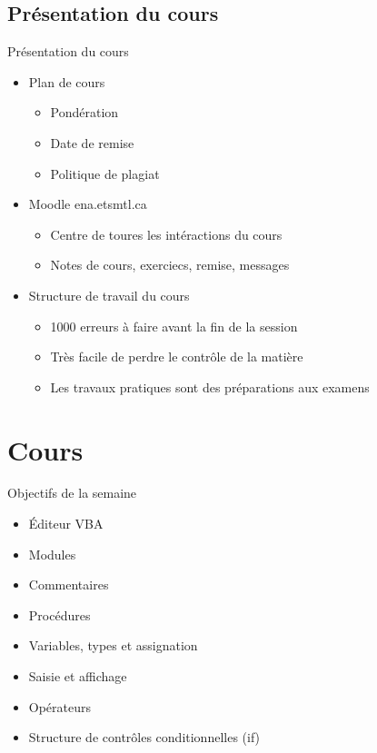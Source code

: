 \documentclass[aspectratio=169,usenames,dvipsnames]{beamer}
\begin{document}
    \subsection{{Présentation du cours}}
    \begin{frame}[t]{Présentation du cours}
        \begin{itemize}
            \item Plan de cours
            \begin{itemize}
                \item Pondération
                \item Date de remise
                \item Politique de plagiat
            \end{itemize}
            \pause
            \item Moodle ena.etsmtl.ca
            \begin{itemize}
                \item Centre de toures les intéractions du cours
                \item Notes de cours, exerciecs, remise, messages
            \end{itemize}
            \pause
            \item Structure de travail du cours
            \begin{itemize}
                \item 1000 erreurs à faire avant la fin de la session
                \item Très facile de perdre le contrôle de la matière
                \item Les travaux pratiques sont des préparations aux examens
            \end{itemize}
        \end{itemize}
    \end{frame}
    \section{Cours}
    \begin{frame}{Objectifs de la semaine}
        \begin{itemize}
            \item Éditeur VBA
            \item Modules
            \item Commentaires
            \item Procédures
            \item Variables, types et assignation
            \item Saisie et affichage
            \item Opérateurs
            \item Structure de contrôles conditionnelles (if)
        \end{itemize}
    \end{frame}
\end{document}
